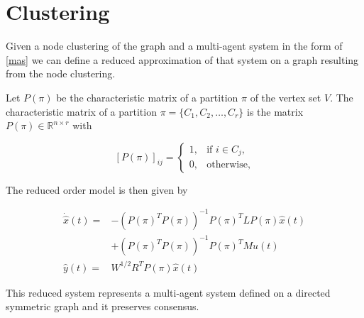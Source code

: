 

\section{Clustering}

Given a node clustering of the graph and a multi-agent system in the form of \eqref{mas} we can define a reduced approximation of that system on a graph resulting from the node clustering. 

Let $P(\pi)$ be the characteristic matrix of a partition $\pi$ of the vertex set $V$. The characteristic matrix of a partition $\pi=\{C_1,C_2,\dots,C_r\}$ is the matrix $P(\pi)\in \mathbb{R}^{n\times r}$ with 

\[
[P(\pi)]_{ij}=\left\{\begin{matrix}
1, & \mbox{if } i\in C_j,\\
0,& \mbox{otherwise},
\end{matrix}\right.
\] 

The reduced order model is then given by

\begin{eqnarray}
\dot{\hat{x}}(t)= &- (P(\pi)^TP(\pi))^{-1}P(\pi)^TLP(\pi)\hat{x}(t)\\
&+(P(\pi)^TP(\pi))^{-1}P(\pi)^TMu(t)\\
\hat{y}(t) =& W^{1/2}R^TP(\pi)\hat{x}(t)
\end{eqnarray}

This reduced system represents a multi-agent system defined on a directed symmetric graph and it preserves consensus. 